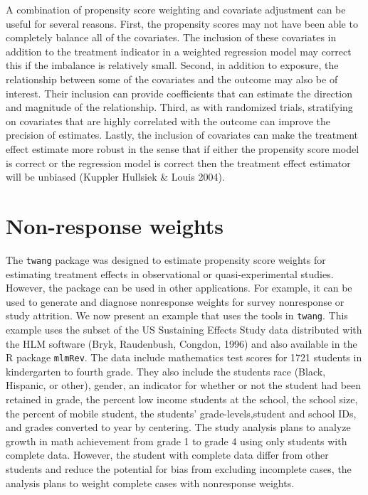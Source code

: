 \documentclass{article}
\begin{document}
A combination of propensity score weighting and covariate adjustment can be
useful for several reasons. First, the propensity scores may not have been able
to completely balance all of the covariates. The inclusion of these covariates
in addition to the treatment indicator in a weighted regression model may
correct this if the imbalance is relatively small. Second, in addition to
exposure, the relationship between some of the covariates and the outcome may
also be of interest. Their inclusion can provide coefficients that can estimate
the direction and magnitude of the relationship. Third, as with randomized
trials, stratifying on covariates that are highly correlated with the outcome
can improve the precision of estimates. Lastly, the inclusion of covariates can
make the treatment effect estimate more robust in the sense that if either the
propensity score model is correct or the regression model is correct then the
treatment effect estimator will be unbiased (Kuppler Hullsiek \& Louis 2004).


\section{Non-response weights} \label{sec:nonresponse}

The \texttt{twang} package was designed to estimate propensity score
weights for estimating treatment effects in observational or
quasi-experimental studies.  However, the package can be used in
other applications.  For example, it can be used to generate and
diagnose nonresponse weights for survey nonresponse or study
attrition.  We now present an example that uses the tools in
\texttt{twang}.  This example uses the subset of the US Sustaining Effects
Study data distributed with the HLM software (Bryk, Raudenbush, Congdon, 1996) 
and also available in the R package \texttt{mlmRev}.  The data include mathematics test
scores for 1721 students in kindergarten to fourth grade.  They also
include the students race (Black, Hispanic, or other), gender, an
indicator for whether or not the student had been retained in grade,
the percent low income students at the school, the school size, the
percent of mobile student, the students' grade-levels,student and
school IDs, and grades converted to year by centering.  The study
analysis plans to analyze growth in math achievement from grade 1 to
grade 4 using only students with complete data.  However, the
student with complete data differ from other students and reduce the
potential for bias from excluding incomplete cases, the analysis
plans to weight complete cases with nonresponse weights.
\end{document}

